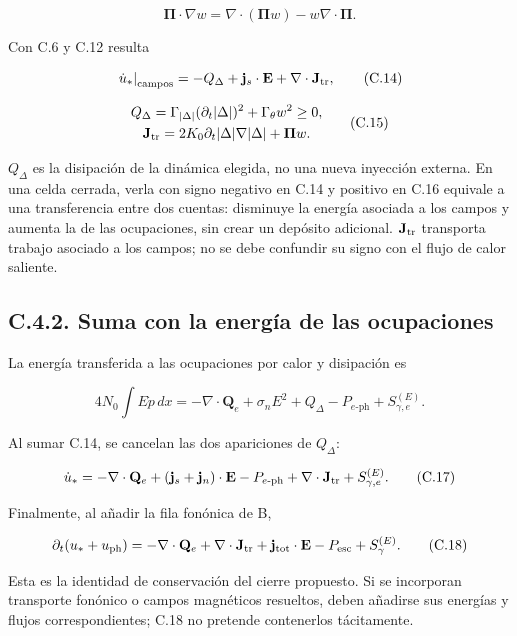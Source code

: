 \documentclass[
  spanish,
  10pt,
  a4paper,
]{article}
\begin{document}
\[
\boldsymbol\Pi\cdot\nabla w
=\nabla\cdot(\boldsymbol\Pi w)-w\nabla\cdot\boldsymbol\Pi.
\]

Con C.6 y C.12 resulta

\[
\left.\dot u_*\right|_{\rm campos}
=-Q_\Delta+\mathbf j_s\cdot\mathbf E
+\nabla\cdot\mathbf J_{\rm tr}, \tag{C.14}
\]

\[
\begin{gathered}
Q_\Delta=\Gamma_{|\Delta|}(\partial_t|\Delta|)^2+\Gamma_\theta w^2\geq0,\\
\mathbf J_{\rm tr}=2K_0\partial_t|\Delta|\nabla |\Delta|+\boldsymbol\Pi w.
\end{gathered} \tag{C.15}
\]

\(Q_\Delta\) es la disipación de la dinámica elegida, no una nueva
inyección externa. En una celda cerrada, verla con signo negativo en
C.14 y positivo en C.16 equivale a una transferencia entre dos cuentas:
disminuye la energía asociada a los campos y aumenta la de las
ocupaciones, sin crear un depósito adicional. \(\mathbf J_{\rm tr}\)
transporta trabajo asociado a los campos; no se debe confundir su signo
con el flujo de calor saliente.

\subsection{C.4.2. Suma con la energía de las
ocupaciones}\label{c.4.2.-suma-con-la-energuxeda-de-las-ocupaciones}

La energía transferida a las ocupaciones por calor y disipación es

\[
4N_0\int E\dot p\,dx=-\nabla\cdot\mathbf Q_e
+\sigma_n E^2+Q_\Delta-P_{e\text{-ph}}+S_{\gamma,e}^{(E)}.
\tag{C.16}
\]

Al sumar C.14, se cancelan las dos apariciones de \(Q_\Delta\):

\[
\dot u_*=-\nabla\cdot\mathbf Q_e
+(\mathbf j_s+\mathbf j_n)\cdot\mathbf E
-P_{e\text{-ph}}+\nabla\cdot\mathbf J_{\rm tr}
+S_{\gamma,e}^{(E)}. \tag{C.17}
\]

Finalmente, al añadir la fila fonónica de B,

\[
\partial_t(u_*+u_{\rm ph})=
-\nabla\cdot\mathbf Q_e+\nabla\cdot\mathbf J_{\rm tr}
+\mathbf j_{\rm tot}\cdot\mathbf E-P_{\rm esc}+S_\gamma^{(E)}.
\tag{C.18}
\]

Esta es la identidad de conservación del cierre propuesto. Si se
incorporan transporte fonónico o campos magnéticos resueltos, deben
añadirse sus energías y flujos correspondientes; C.18 no pretende
contenerlos tácitamente.
\end{document}
